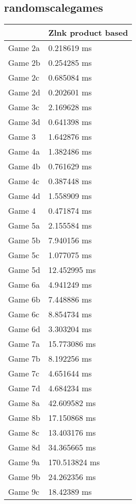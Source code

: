 \subsection{randomscalegames}
\begin{tabular}{|l|l|}
	\hline
	& Zlnk product based \\ \hline
	Game 2a & 0.218619 ms \\ \hline
	Game 2b & 0.254285 ms \\ \hline
	Game 2c & 0.685084 ms \\ \hline
	Game 2d & 0.202601 ms \\ \hline
	Game 3c & 2.169628 ms \\ \hline
	Game 3d & 0.641398 ms \\ \hline
	Game 3 & 1.642876 ms \\ \hline
	Game 4a & 1.382486 ms \\ \hline
	Game 4b & 0.761629 ms \\ \hline
	Game 4c & 0.387448 ms \\ \hline
	Game 4d & 1.558909 ms \\ \hline
	Game 4 & 0.471874 ms \\ \hline
	Game 5a & 2.155584 ms \\ \hline
	Game 5b & 7.940156 ms \\ \hline
	Game 5c & 1.077075 ms \\ \hline
	Game 5d & 12.452995 ms \\ \hline
	Game 6a & 4.941249 ms \\ \hline
	Game 6b & 7.448886 ms \\ \hline
	Game 6c & 8.854734 ms \\ \hline
	Game 6d & 3.303204 ms \\ \hline
	Game 7a & 15.773086 ms \\ \hline
	Game 7b & 8.192256 ms \\ \hline
	Game 7c & 4.651644 ms \\ \hline
	Game 7d & 4.684234 ms \\ \hline
	Game 8a & 42.609582 ms \\ \hline
	Game 8b & 17.150868 ms \\ \hline
	Game 8c & 13.403176 ms \\ \hline
	Game 8d & 34.365665 ms \\ \hline
	Game 9a & 170.513824 ms \\ \hline
	Game 9b & 24.262356 ms \\ \hline
	Game 9c & 18.42389 ms \\ \hline

\end{tabular}
